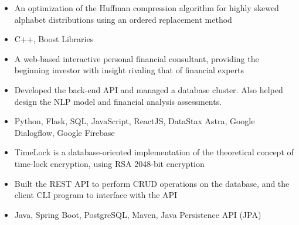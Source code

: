 \documentclass[11pt,letterpaper]{article}
\begin{document}
  \ifhuffskew
    {\fontsize{12}{12}}

    \begin{itemize}
      \item{An optimization of the Huffman compression algorithm for highly skewed alphabet distributions using an ordered replacement method}
      \item{
        {}
        C++, Boost Libraries
      }
    \end{itemize}
  \fi

  \iffizz
    {\fontsize{12}{12}}

    \begin{itemize}
      \item{A web-based interactive personal financial consultant, providing the beginning investor with insight rivaling that of financial experts}
      \item{Developed the back-end API and managed a database cluster. Also helped design the NLP model and financial analysis assessments.}
      \item{
        {}
        Python, Flask, SQL, JavaScript, ReactJS, DataStax Astra, Google Dialogflow, Google Firebase
      }
    \end{itemize}
  \fi

  \iftimelock
    {\fontsize{12}{12}}

    \begin{itemize}
      \item{TimeLock is a database-oriented implementation of the theoretical concept of time-lock encryption, using RSA 2048-bit encryption}

      \item{Built the REST API to perform CRUD operations on the database, and the client CLI program to interface with the API}

      \item{
        {}
        Java, Spring Boot, PostgreSQL, Maven, Java Persistence API (JPA)
      }
    \end{itemize}
  \fi
\end{document}
